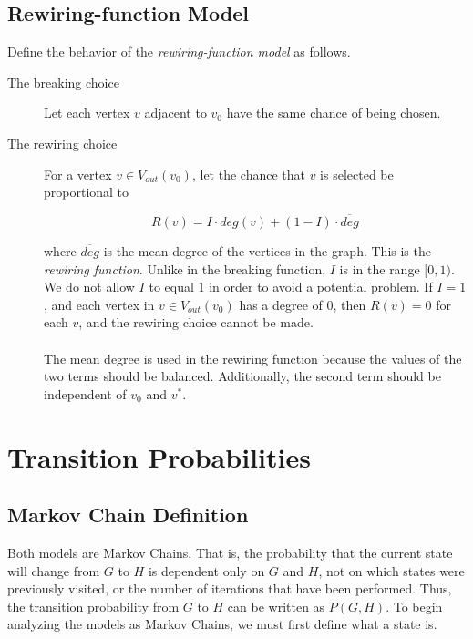 \documentclass[a4paper,10pt]{article}
\begin{document}
\subsection{Rewiring-function Model}

Define the behavior of the \emph{rewiring-function model} as follows.

\begin{description}
 \item[The breaking choice] Let each vertex $v$ adjacent to $v_0$ have the same chance of being chosen.

 \item[The rewiring choice] For a vertex $v \in V_{out}(v_0)$, let the chance that $v$ is selected be proportional to

 \begin{equation}
\label{eqn:rewiring-function}
 R(v) = I \cdot deg(v) + (1 - I) \cdot \overline{deg}
 \end{equation}

where $\overline{deg}$ is the mean degree of the vertices in the graph. This is the \emph{rewiring function}. Unlike in the breaking function, $I$ is in the range $[0, 1)$. We do not allow $I$ to equal 1 in order to avoid a potential problem. If $I = 1$, and each vertex in $v \in V_{out}(v_0)$ has a degree of 0, then $R(v) = 0$ for each $v$, and the rewiring choice cannot be made. 
  
\paragraph{} The mean degree is used in the rewiring function because the values of the two terms should be balanced. Additionally, the second term should be independent of $v_0$ and $v^*$.

\end{description}

\section{Transition Probabilities}

\subsection{Markov Chain Definition}
Both models are Markov Chains. That is, the probability that the current state will change from $G$ to $H$ is dependent only on $G$ and $H$, not on which states were previously visited, or the number of iterations that have been performed. Thus, the transition probability from $G$ to $H$ can be written as $P(G, H)$. To begin analyzing the models as Markov Chains, we must first define what a state is.
\end{document}
